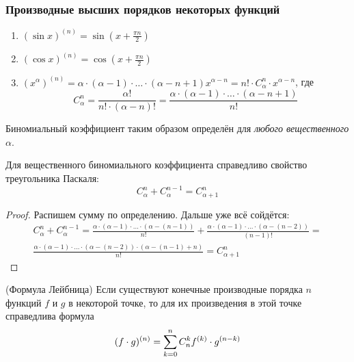 \subsubsection*{Производные высших порядков некоторых функций}

\begin{enumerate}
	\item $(\sin x)^{(n)} = \sin (x + \frac{\pi n}{2})$
	\item $(\cos x)^{(n)} = \cos (x + \frac{\pi n}{2})$
	\item $(x^\alpha)^{(n)} = \alpha \cdot (\alpha - 1) \cdot \ldots \cdot (\alpha - n + 1) x^{\alpha - n} = n! \cdot C_{\alpha}^n \cdot x^{\alpha - n}$, где
	\[
		C_{\alpha}^n = \frac{\alpha!}{n! \cdot (\alpha - n)!} = \frac{\alpha \cdot (\alpha - 1) \cdot \ldots \cdot (\alpha - n + 1)}{n!}
	\]
\end{enumerate}

\begin{note}
	Биномиальный коэффициент таким образом определён для \textit{любого вещественного $\alpha$}.
\end{note}

\begin{theorem}
	Для вещественного биномиального коэффициента справедливо свойство треугольника Паскаля:
	\[
		C_\alpha^n + C_\alpha^{n - 1} = C_{\alpha + 1}^n
	\]
\end{theorem}

\begin{proof}
	Распишем сумму по определению. Дальше уже всё сойдётся:
	\begin{multline*}
		C_\alpha^n + C_\alpha^{n - 1} = \frac{\alpha \cdot (\alpha - 1) \cdot \ldots \cdot (\alpha - (n - 1))}{n!} + \frac{\alpha \cdot (\alpha - 1) \cdot \ldots \cdot (\alpha - (n - 2))}{(n - 1)!} =
		\\
		\frac{\alpha \cdot (\alpha - 1) \cdot \ldots \cdot (\alpha - (n - 2)) \cdot (\alpha - (n - 1) + n)}{n!} = C_{\alpha + 1}^n
	\end{multline*}
\end{proof}

\begin{theorem} (Формула Лейбница)
	Если существуют конечные производные порядка $n$ функций $f$ и $g$ в некоторой точке, то для их произведения в этой точке справедлива формула
	\[
		(f \cdot g)^{(n)} = \sum\limits_{k = 0}^{n} C_n^k f^{(k)} \cdot g^{(n - k)}
	\]
\end{theorem}

